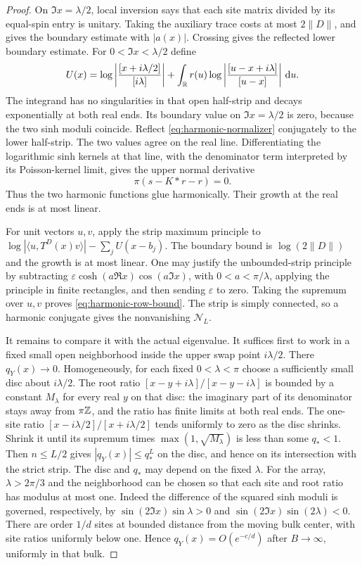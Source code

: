 \begin{proof}
On $\Im x=\lambda/2$, local inversion says that each site matrix
divided by its equal-spin entry is unitary.  Taking the auxiliary
trace costs at most $2\|D\|$, and gives the boundary estimate with
$|a(x)|$.  Crossing gives the reflected lower boundary estimate.
For $0<\Im x<\lambda/2$ define
\begin{equation}\label{eq:harmonic-normalizer}
 U(x)=\log\left|\frac{[x+i\lambda/2]}{[i\lambda]}\right|
       +\int_\mathbb R r(u)
            \log\left|\frac{[u-x+i\lambda]}{[u-x]}\right|\,\mathrm d u.
\end{equation}
The integrand has no singularities in that open half-strip and
decays exponentially at both real ends.  Its boundary value on
$\Im x=\lambda/2$ is zero, because the two sinh moduli coincide.
Reflect \eqref{eq:harmonic-normalizer} conjugately to the lower
half-strip.  The two values agree on the real line.  Differentiating
the logarithmic sinh kernels at that line, with the denominator
term interpreted by its Poisson-kernel limit, gives the upper
normal derivative
\[
 \pi(s-K*r-r)=0.
\]
Thus the two harmonic functions glue harmonically.  Their growth
at the real ends is at most linear.

For unit vectors $u,v$, apply the strip maximum principle to
$\log|\langle u,T^D(x)v\rangle|-\sum_jU(x-b_j)$.
The boundary bound is $\log(2\|D\|)$ and the growth is at most
linear.  One may justify the unbounded-strip principle by subtracting
$\varepsilon\cosh(a\Re x)\cos(a\Im x)$, with
$0<a<\pi/\lambda$, applying the principle in finite rectangles,
and then sending $\varepsilon$ to zero.
Taking the supremum over $u,v$ proves
\eqref{eq:harmonic-row-bound}.  The strip is simply connected, so
a harmonic conjugate gives the nonvanishing $\mathcal N_L$.

It remains to compare it with the actual eigenvalue.
It suffices first to work in a fixed small open neighborhood inside
the upper swap point $i\lambda/2$.
There $q_Y(x)\to0$.  Homogeneously, for each fixed
$0<\lambda<\pi$ choose a sufficiently small disc about
$i\lambda/2$.  The root ratio
$[x-y+i\lambda]/[x-y-i\lambda]$ is bounded by a constant
$M_\lambda$ for every real $y$ on that disc: the imaginary part
of its denominator stays away from $\pi\mathbb Z$, and the ratio has
finite limits at both real ends.  The one-site ratio
$[x-i\lambda/2]/[x+i\lambda/2]$ tends uniformly to zero as
the disc shrinks.  Shrink it until its supremum times
$\max(1,\sqrt{M_\lambda})$ is less than some $q_*<1$.
Then $n\le L/2$ gives $|q_Y(x)|\le q_*^L$ on the disc,
and hence on its intersection with the strict strip.
The disc and $q_*$ may depend on the fixed $\lambda$.
For the array, $\lambda>2\pi/3$ and the neighborhood can be chosen
so that each site and root ratio has modulus at most one.
Indeed the difference of the squared sinh moduli is governed,
respectively, by $\sin(2\Im x)\sin\lambda>0$ and
$\sin(2\Im x)\sin(2\lambda)<0$.
There are order $1/d$ sites at bounded distance from the moving
bulk center, with site ratios uniformly below one.  Hence
$q_Y(x)=O(e^{-c/d})$ after $B\to\infty$, uniformly in that bulk.


\end{proof}
